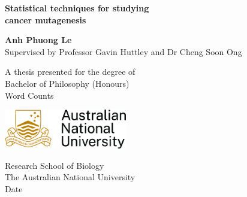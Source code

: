 \begin{titlepage}
    \begin{center}
        \vspace*{1cm}
        \Huge
        \textbf{Statistical techniques for studying \\ cancer mutagenesis} \\

        \LARGE
        \vspace{3cm}
            
        \textbf{Anh Phuong Le} \\
        \vspace{1cm}
        \normalsize
        Supervised by Professor Gavin Huttley and Dr Cheng Soon Ong
            
        \vfill
        
        \normalsize    
        A thesis presented for the degree of\\
        Bachelor of Philosophy (Honours) \\
        Word Counts
            
        \vspace{0.8cm}
            
        \includegraphics[width=0.4\textwidth]{graphics/ANU_Primary_Horizontal_GoldBlack.jpg}
            
        \Large
        Research School of Biology\\
        The Australian National University\\
        Date
            
    \end{center}
\end{titlepage}